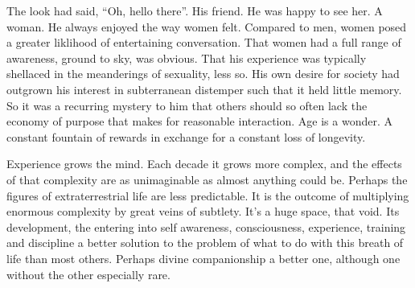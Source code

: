 

﻿The look had said, ``Oh, hello there''.  His friend.  He was happy to
see her.  A woman.  He always enjoyed the way women felt.  Compared to
men, women posed a greater liklihood of entertaining conversation.
That women had a full range of awareness, ground to sky, was obvious.
That his experience was typically shellaced in the meanderings of
sexuality, less so.  His own desire for society had outgrown his
interest in subterranean distemper such that it held little memory.
So it was a recurring mystery to him that others should so often lack
the economy of purpose that makes for reasonable interaction.  Age is
a wonder.  A constant fountain of rewards in exchange for a constant
loss of longevity.

Experience grows the mind.  Each decade it grows more complex, and the
effects of that complexity are as unimaginable as almost anything
could be.  Perhaps the figures of extraterrestrial life are less
predictable.  It is the outcome of multiplying enormous complexity by
great veins of subtlety.  It’s a huge space, that void.  Its
development, the entering into self awareness, consciousness,
experience, training and discipline a better solution to the problem
of what to do with this breath of life than most others.  Perhaps
divine companionship a better one, although one without the other
especially rare.

\bye

